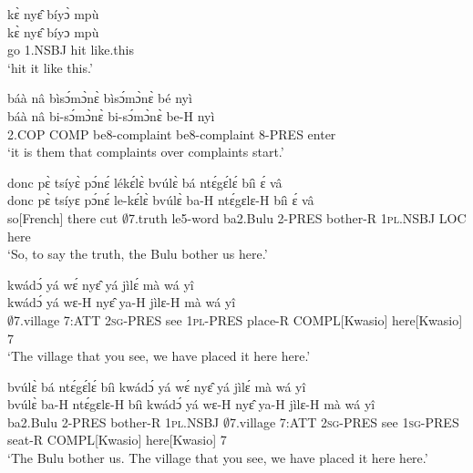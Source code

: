 \begin{exe} 
\exC\label{126} 
  \glll  kɛ̀ nyɛ̂ bíyɔ̀ mpù \\
         kɛ̀ nyɛ̂ bíyɔ mpù \\
          go 1.NSBJ hit like.this  \\
    \trans `hit it like this.'
\end{exe}

\begin{exe} 
\exC\label{127} 
  \glll  báà nâ bìsɔ́mɔ̀nɛ̀ bìsɔ́mɔ̀nɛ̀ bé nyì \\
        báà nâ bi-sɔ́mɔ̀nɛ̀ bi-sɔ́mɔ̀nɛ̀ be-H nyì \\
         2.COP COMP be8-complaint be8-complaint 8-PRES enter   \\
    \trans `it is them that complaints over complaints start.'
\end{exe}

\begin{exe} 
\exC\label{128}
  \glll  donc pɛ̀ tsíyɛ̀ pɔ́nɛ́ lékɛ́lɛ̀ bvúlɛ̀ bá ntɛ́gɛ́lɛ́ bíì ɛ́ vâ \\
         donc pɛ̀ tsíyɛ pɔ́nɛ́ le-kɛ́lɛ̀ bvúlɛ̀ ba-H ntɛ́gɛlɛ-H bíì ɛ́ vâ \\
         so[French] there cut $\emptyset$7.truth le5-word ba2.Bulu 2-PRES bother-R 1\textsc{pl}.NSBJ LOC here   \\
    \trans `So, to say the truth, the Bulu bother us here.'
\end{exe}

\begin{exe} 
\exC\label{129}
  \glll kwádɔ́ yá wɛ́ nyɛ̂ yá jìlɛ́ mà wá yî \\
          kwádɔ́ yá wɛ-H nyɛ̂ ya-H jìlɛ-H mà wá yî \\
         $\emptyset$7.village 7:ATT 2\textsc{sg}-PRES see 1\textsc{pl}-PRES place-R COMPL[Kwasio] here[Kwasio] 7   \\
    \trans `The village that you see, we have placed it here here.'
\end{exe}

\begin{exe} 
\exC\label{130}
  \glll bvúlɛ̀ bá ntɛ́gɛ́lɛ́ bíì kwádɔ́ yá wɛ́ nyɛ̂ yá jìlɛ́ mà wá yî \\
        bvúlɛ̀ ba-H ntɛ́gɛlɛ-H bíì kwádɔ́ yá wɛ-H nyɛ̂ ya-H jìlɛ-H mà wá yî \\
          ba2.Bulu 2-PRES bother-R 1\textsc{pl}.NSBJ $\emptyset$7.village 7:ATT 2\textsc{sg}-PRES see 1\textsc{sg}-PRES seat-R COMPL[Kwasio] here[Kwasio] 7  \\
    \trans `The Bulu bother us. The village that you see, we have placed it here here.'
\end{exe}

